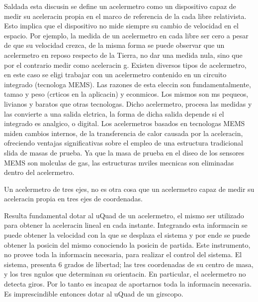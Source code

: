 \documentclass[spanish,12pt,a4paper,titlepage]{report}
\begin{document}
Saldada esta discusin se define un acelermetro como un dispositivo capaz de medir su aceleracin propia en el marco de referencia de la cada libre relativista. Esto implica que el dispositivo no mide siempre su cambio de velocidad en el espacio.
Por ejemplo, la medida de un acelermetro en cada libre ser cero a pesar de que su velocidad crezca, de la misma forma se puede observar que un acelermetro en reposo respecto de la Tierra, no dar una medida nula, sino que por el contrario medir como aceleracin g.
Existen diversos tipos de acelermetro, en este caso se eligi trabajar con un acelermetro contenido en un circuito integrado (tecnologa MEMS). Las razones de esta eleccin son fundamentalmente, tamao y peso (crticos en la aplicacin) y econmicos. Los mismos son ms pequeos, livianos y baratos que otras tecnologas.
Dicho acelermetro, procesa las medidas y las convierte a una salida elctrica, la forma de dicha salida depende si el integrado es analgico, o digital.
Los acelermetros basados en tecnologas MEMS miden cambios internos, de la transferencia de calor causada por la aceleracin, ofreciendo ventajas significativas sobre el empleo de una estructura tradicional slida de masas de prueba.
Ya que la masa de prueba en el diseo de los sensores MEMS son molculas de gas, las estructuras mviles mecnicas son eliminadas dentro del acelermetro.

Un acelermetro de tres ejes, no es otra cosa que un acelermetro capaz de medir su aceleracin propia en tres ejes de coordenadas.

Resulta fundamental dotar al uQuad de un acelermetro, el mismo ser utilizado para obtener la aceleracin lineal en cada instante. Integrando esta informacin se puede obtener la velocidad con la que se desplaza el sistema y por ende se puede obtener la posicin del mismo conociendo la posicin de partida.
Este instrumento, no provee toda la informacin necesaria, para realizar el control del sistema. El sistema, presenta 6 grados de libertad; las tres coordenadas de su centro de masa, y los tres ngulos que determinan su orientacin.
En particular, el acelermetro no detecta giros. Por lo tanto es incapaz de aportarnos toda la informacin necesaria. Es imprescindible entonces dotar al uQuad de un girscopo. 
 
\end{document}
